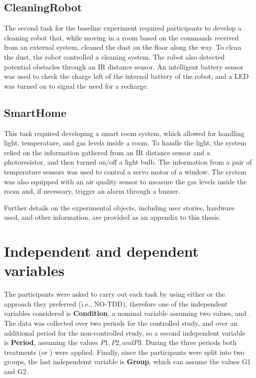 \subsection{CleaningRobot}
The second task for the baseline experiment required participants to develop a cleaning robot that, while moving in a room based on the commands received from an external system, cleaned the dust on the floor along the way. To clean the dust, the robot controlled a cleaning system. The robot also detected potential obstacles through an IR distance sensor. An intelligent battery sensor was used to check the charge left of the internal battery of the robot, and a LED was turned on to signal the need for a recharge.

\subsection{SmartHome}
This task required developing a smart room system, which allowed for handling light, temperature, and gas levels inside a room. To handle the light, the system relied on the information gathered from an IR distance sensor and a photoresistor, and then turned on/off a light bulb. The information from a pair of temperature sensors was used to control a servo motor of a window. The system was also equipped with an air quality sensor to measure the gas levels inside the room and, if necessary, trigger an alarm through a buzzer. 



Further details on the experimental objects, including user stories, hardware used, and other information, are provided as an appendix to this thesis.


\section{Independent and dependent variables}
The participants were asked to carry out each task by using either \tdd or the approach they preferred (i.e., NO-TDD), therefore one of the independent variables considered is \textbf{Condition}, a nominal variable assuming two values, \tdd and \notdd. The data was collected over two periods for the controlled study, and over an additional period for the non-controlled study, so a second independent variable is \textbf{Period}, assuming the values $P1, P2, and P3$. During the three periods both treatments (\tdd or \notdd) were applied. Finally, since the participants were split into two groups, the last independemt variable is \textbf{Group}, which can assume the values G1 and G2.


